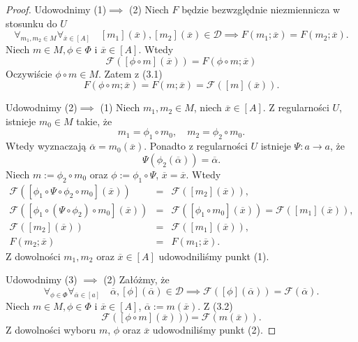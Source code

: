 \documentclass[12pt,a4paper]{report}
\newcommand{\domkniecie}[1]{\left[ {#1} \right] }
\begin{document}
\begin{proof}
Udowodnimy (1)$\implies$ (2)
Niech $F$ będzie bezwzględnie niezmiennicza w stosunku do $U$
\begin{equation}
\forall_{m_{1}, m_{2} \in M}  \forall_{\overline{x} \in \domkniecie{A}} \quad \domkniecie{m_1}(\overline{x}), \domkniecie{m_2}(\overline{x})\in \mathcal{D} \implies F(m_{1};\overline{x})=F(m_{2};\overline{x}).
\end{equation}
Niech $m \in M, \phi \in \Phi$ i $\overline{x} \in \domkniecie{A}$. Wtedy
$$
\mathcal{F}(\domkniecie{\phi \circ m}(\overline{x}))=F(\phi \circ m;\overline{x})
$$
Oczywiście $\phi \circ m \in M$. Zatem z (3.1)
$$
F(\phi \circ m; \overline{x})=F(m;\overline{x})=\mathcal{F}(\domkniecie{m}(\overline{x})).
$$

Udowodnimy (2)$\implies$ (1)
Niech $m_1,m_2 \in M$, niech $\overline{x} \in\domkniecie{A}$.
Z regularności $U$, istnieje $m_0\in M$ takie, że
$$
m_1=\phi_1\circ m_0, \quad m_2=\phi_2\circ m_0.
$$
Wtedy wyznaczają $\overline{\alpha}=m_0(\overline{x})$.
Ponadto z regularności $U$ istnieje $\Psi:a\to a$, że
$$
 \Psi(\phi_2(\overline{\alpha}))=\overline{\alpha}.
$$
Niech $m:=\phi_2\circ m_0$ oraz $\phi:=\phi_1\circ\Psi$, $\overline{x}=\overline{x}$. Wtedy
\begin{eqnarray*}
\mathcal{F}(\domkniecie{\phi_1\circ \Psi\circ \phi_2 \circ m_0}(\overline{x})) & = & \mathcal{F}(\domkniecie{m_2}(\overline{x})), \\
\mathcal{F}(\domkniecie{\phi_1\circ(\Psi\circ \phi_2)\circ m_0}(\overline{x})) & = & \mathcal{F}(\domkniecie{\phi_1\circ m_0}(\overline{x})) = \mathcal{F}(\domkniecie{m_1}(\overline{x})),\\
\mathcal{F}(\domkniecie{m_2}(\overline{x})) & = & \mathcal{F}(\domkniecie{m_1}(\overline{x})),\\
F(m_2;\overline{x}) & = & F(m_1;\overline{x}).
\end{eqnarray*}
Z dowolności $m_1,m_2$ oraz $\overline{x} \in \domkniecie{A}$ udowodniliśmy punkt (1).

Udowodnimy (3) $\implies$ (2)
Załóżmy, że
\begin{equation}
\forall_{\phi \in \Phi} \forall_{\overline{\alpha} \in \domkniecie{a}} \quad \overline{\alpha}, \domkniecie{\phi}(\overline{\alpha})\in \mathcal{D} \implies \mathcal{F}(\domkniecie{\phi}(\overline{\alpha}))=\mathcal{F}(\overline{\alpha}).
\end{equation}
Niech $m\in M, \phi \in \Phi$ i $\overline{x} \in\domkniecie{A}$, $\overline{\alpha}:=m(\overline{x})$. Z (3.2)
$$
 \mathcal{F}(\domkniecie{\phi\circ m}(\overline{x})))=\mathcal{F}(m(\overline{x})).
$$
Z dowolności wyboru $m$, $\phi$ oraz $\overline{x}$ udowodniliśmy punkt (2).


\end{proof}
\end{document}
